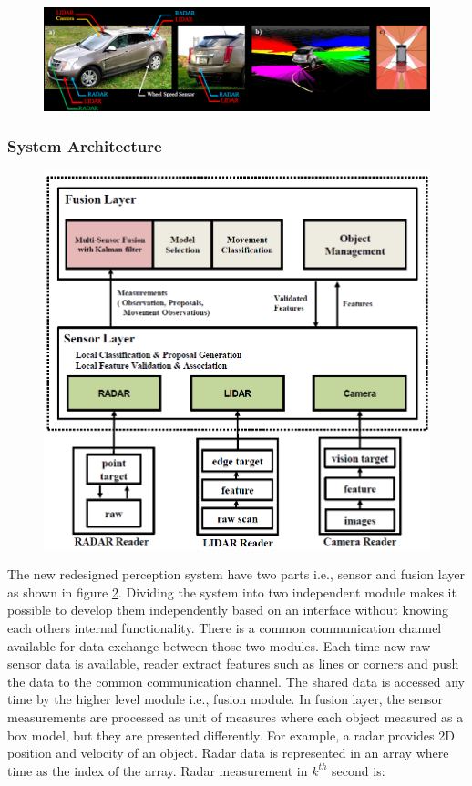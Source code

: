 \begin{figure}
  \centering
  \includegraphics[width=1\textwidth]{src/pic/Sensor_Setup_Multiple_View.png}
  \caption{\cite{Cho_2014}}
  \label{fig:Sensor_Setup_Multiple_View}
\end{figure}

\subsubsection{System Architecture}
\begin{figure}
  \centering
  \includegraphics[width=.6\textwidth]{src/pic/Fusion_Arch_Multiple_View.png}
  \caption{\cite{Cho_2014}}
  \label{fig:Fusion_Arch_Multiple_View}
\end{figure}
The new redesigned perception system have two parts i.e., sensor and fusion layer as shown in figure \ref{fig:Fusion_Arch_Multiple_View}. Dividing the system into two independent module makes it possible to develop them independently based on an interface without knowing each others internal functionality. There is a common communication channel available for data exchange between those two modules. Each time new raw sensor data is available, reader extract features such as lines or corners and push the data to the common communication channel. The shared data is accessed any time by the higher level module i.e., fusion module. In fusion layer, the sensor measurements are processed as unit of measures where each object measured as a box model, but they are presented differently\cite{Cho_2014}. For example, a radar provides 2D position and velocity of an object. Radar data is represented in an array where time as the index of the array. Radar measurement in $k^{th}$ second  is:

